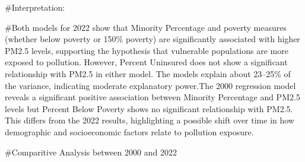 \documentclass[
]{article}
\begin{document}
\#Interpretation:

\#Both models for 2022 show that Minority Percentage and poverty
measures (whether below poverty or 150\% poverty) are significantly
associated with higher PM2.5 levels, supporting the hypothesis that
vulnerable populations are more exposed to pollution. However, Percent
Uninsured does not show a significant relationship with PM2.5 in either
model. The models explain about 23--25\% of the variance, indicating
moderate explanatory power.The 2000 regression model reveals a
significant positive association between Minority Percentage and PM2.5
levels but Percent Below Poverty shows no significant relationship with
PM2.5. This differs from the 2022 results, highlighting a possible shift
over time in how demographic and socioeconomic factors relate to
pollution exposure.

\#Comparitive Analysis between 2000 and 2022
\end{document}
